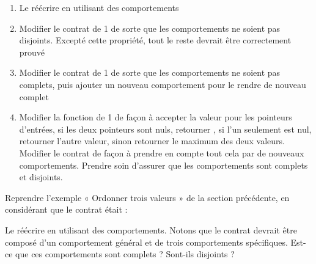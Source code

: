 \begin{enumerate}
\item Le réécrire en utilisant des comportements
\item Modifier le contrat de 1 de sorte que les comportements ne
  soient pas disjoints. Excepté cette propriété, tout le reste devrait
  être correctement prouvé
\item Modifier le contrat de 1 de sorte que les comportements ne
  soient pas complets, puis ajouter un nouveau comportement pour le
  rendre de nouveau complet
\item Modifier la fonction de 1 de façon à accepter la valeur
   pour les pointeurs d'entrées, si les deux pointeurs
  sont nuls, retourner  , si l'un seulement est
  nul, retourner l'autre valeur, sinon retourner le maximum des deux
  valeurs. Modifier le contrat de façon à prendre en compte tout cela
  par de nouveaux comportements. Prendre soin d'assurer que les comportements
  sont complets et disjoints.
\end{enumerate}





Reprendre l'exemple « Ordonner trois valeurs » de la section
précédente, en considérant que le contrat était :




Le réécrire en utilisant des comportements. Notons que le contrat
devrait être composé d'un comportement général et de trois
comportements spécifiques. Est-ce que ces comportements sont complets ?
Sont-ils disjoints ?
